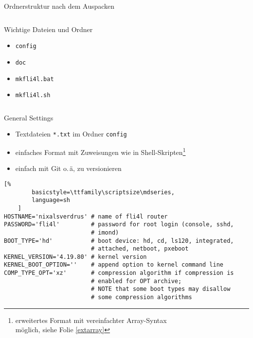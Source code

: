 \documentclass[t]{beamer}
\begin{document}
\begin{frame}{Ordnerstruktur nach dem Auspacken}
    \begin{figure}
    \end{figure}

    \begin{columns}[T,onlytextwidth]
        \begin{column}{0.5\textwidth}
            \begin{block}{Wichtige Dateien und Ordner}
                \begin{itemize}
                    \item \texttt{config}
                    \item \texttt{doc}
                    \item \texttt{mkfli4l.bat}
                    \item \texttt{mkfli4l.sh}
                \end{itemize}
            \end{block}
        \end{column}
        \begin{column}{0.5\textwidth}
            \begin{figure}
            \end{figure}
        \end{column}
    \end{columns}
\end{frame}

\begin{frame}[fragile]{General Settings}
    \begin{itemize}
        \item Textdateien \texttt{*.txt} im Ordner \texttt{config}
        \item einfaches Format mit Zuweisungen wie in
            Shell-Skripten\footnote{erweitertes Format mit vereinfachter
            Array-Syntax\\möglich, siehe Folie \ref{extarray}}
        \item einfach mit Git o.\,ä, zu versionieren
    \end{itemize}

    \begin{lstlisting}[%
        basicstyle=\ttfamily\scriptsize\mdseries,
        language=sh
    ]
HOSTNAME='nixalsverdrus' # name of fli4l router
PASSWORD='fli4l'         # password for root login (console, sshd,
                         # imond)
BOOT_TYPE='hd'           # boot device: hd, cd, ls120, integrated,
                         # attached, netboot, pxeboot
KERNEL_VERSION='4.19.80' # kernel version
KERNEL_BOOT_OPTION=''    # append option to kernel command line
COMP_TYPE_OPT='xz'       # compression algorithm if compression is
                         # enabled for OPT archive;
                         # NOTE that some boot types may disallow
                         # some compression algorithms
    \end{lstlisting}
\end{frame}
\end{document}

